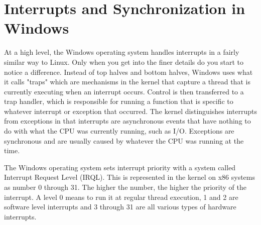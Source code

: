 \documentclass[10pt,serif,draftclsnofoot,onecolumn]{IEEEtran}
\begin{document}
	\section{Interrupts and Synchronization in Windows}
	\par
			At a high level, the Windows operating system handles interrupts in a fairly similar way to Linux. Only when you get into the finer details do you start to notice a difference. Instead of top halves and bottom halves, Windows uses what it calls "traps" which are mechanisms in the kernel that capture a thread that is currently executing when an interrupt occurs. Control is then transferred to a trap handler, which is responsible for running a function that is specific to whatever interrupt or exception that occurred\cite{5}. The kernel distinguishes interrupts from exceptions in that interrupts are asynchronous events that have nothing to do with what the CPU was currently running, such as I/O. Exceptions are synchronous and are usually caused by whatever the CPU was running at the time.
	\newline
	\par
			The Windows operating system sets interrupt priority with a system called Interrupt Request Level (IRQL). This is represented in the kernel on x86 systems as number 0 through 31. The higher the number, the higher the priority of the interrupt. A level 0 means to run it at regular thread execution, 1 and 2 are software level interrupts and 3 through 31 are all various types of hardware interrupts\cite{5}.
			
	\newpage


	
	
\end{document}
